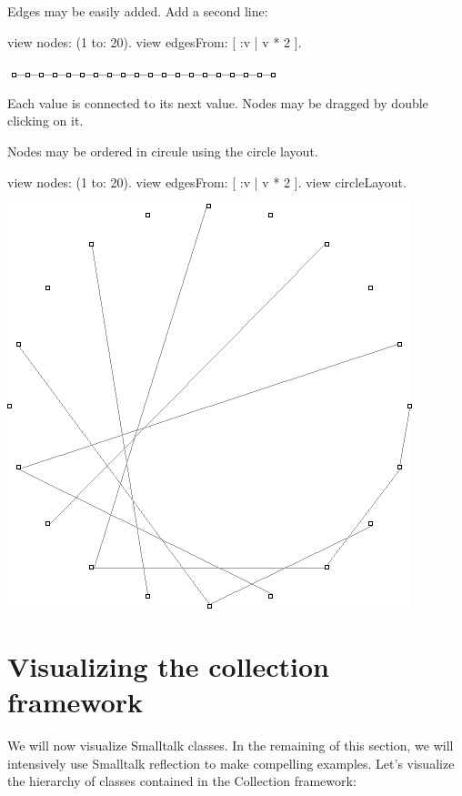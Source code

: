 \documentclass[a4paper,10pt,twoside]{book}
\begin{document}
Edges may be easily added. Add a second line:

\begin{code}{}
view nodes: (1 to: 20).
view edgesFrom: [ :v | v * 2 ].
\end{code}
\begin{center}\includegraphics[scale=0.4]{picture2}\end{center}


Each value is connected to its next value. Nodes may be dragged by double clicking on it.

Nodes may be ordered in circule using the circle layout.

\begin{code}{}
view nodes: (1 to: 20).
view edgesFrom: [ :v | v * 2 ].
view circleLayout.
\end{code}
\begin{center}\includegraphics[scale=0.4]{picture3}\end{center}


\section{Visualizing the collection framework}
We will now visualize Smalltalk classes. In the remaining of this section, we will intensively use Smalltalk reflection to make compelling examples. Let's visualize the hierarchy of classes contained in the Collection framework:
\end{document}
